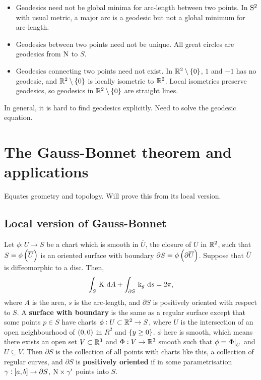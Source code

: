 \begin{remark*}
\hfill
\begin{itemize}
\item Geodesics need not be global minima for arc-length between two points. In $ \S^2 $ with usual metric, a major arc is a geodesic but not a global minimum for arc-length.
\item Geodesics between two points need not be unique. All great circles are geodesics from $ \N $ to $ S $.
\item Geodesics connecting two points need not exist. In $ \RR^2 \setminus \cbr{0} $, $ 1 $ and $ -1 $ has no geodesic, and $ \RR^2 \setminus \cbr{0} $ is locally isometric to $ \RR^2 $. Local isometries preserve geodesics, so geodesics in $ \RR^2 \setminus \cbr{0} $ are straight lines.
\end{itemize}
In general, it is hard to find geodesics explicitly. Need to solve the geodesic equation.
\end{remark*}

\pagebreak

\section{The Gauss-Bonnet theorem and applications}


Equates geometry and topology. Will prove this from its local version.

\subsection{Local version of Gauss-Bonnet}

\begin{theorem}
Let $ \phi : U \to S $ be a chart which is smooth in $ \overline{U} $, the closure of $ U $ in $ \RR^2 $, such that $ S = \phi\br{\overline{U}} $ is an oriented surface with boundary $ \partial S = \phi\br{\partial\overline{U}} $. Suppose that $ \overline{U} $ is diffeomorphic to a disc. Then,
$$ \intd{S}{}{\K}{A} + \intd{\partial S}{}{\k_g}{s} = 2\pi, $$
where $ A $ is the area, $ s $ is the arc-length, and $ \partial S $ is positively oriented with respect to $ S $. A \textbf{surface with boundary} is the same as a regular surface except that some points $ p \in S $ have charts $ \phi : U \subset \RR^2 \to S $, where $ U $ is the intersection of an open neighbourhood of $ \br{0, 0} $ in $ R^2 $ and $ \cbr{y \ge 0} $. $ \phi $ here is smooth, which means there exists an open set $ V \subset \RR^3 $ and $ \Phi : V \to \RR^3 $ smooth such that $ \phi = \eval{\Phi}_U $ and $ U \subseteq V $. Then $ \partial S $ is the collection of all points with charts like this, a collection of regular curves, and $ \partial S $ is \textbf{positively oriented} if in some parametrisation $ \gamma : \sbr{a, b} \to \partial S $, $ \N \times \gamma' $ points into $ S $.
\end{theorem}

